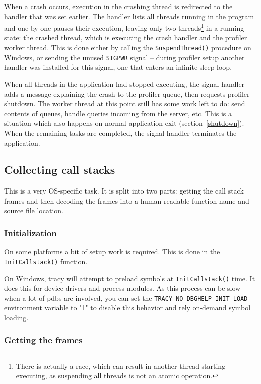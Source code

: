 \documentclass[hidelinks,titlepage,a4paper]{article}
\begin{document}
When a crash occurs, execution in the crashing thread is redirected to the handler that was set earlier. The handler lists all threads running in the program and one by one pauses their execution, leaving only two threads\footnote{There is actually a race, which can result in another thread starting executing, as suspending all threads is not an atomic operation.} in a running state: the crashed thread, which is executing the crash handler and the profiler worker thread. This is done either by calling the \texttt{SuspendThread()} procedure on Windows, or sending the unused \texttt{SIGPWR} signal -- during profiler setup another handler was installed for this signal, one that enters an infinite sleep loop.

When all threads in the application had stopped executing, the signal handler adds a message explaining the crash to the profiler queue, then requests profiler shutdown. The worker thread at this point still has some work left to do: send contents of queues, handle queries incoming from the server, etc. This is a situation which also happens on normal application exit (section~\ref{shutdown}). When the remaining tasks are completed, the signal handler terminates the application.

\subsection{Collecting call stacks}
\label{collectingcallstacks}

This is a very OS-specific task. It is split into two parts: getting the call stack frames and then decoding the frames into a human readable function name and source file location.

\subsubsection{Initialization}

On some platforms a bit of setup work is required. This is done in the \texttt{InitCallstack()} function.

On Windows, tracy will attempt to preload symbols at \texttt{InitCallstack()} time. It does this for device drivers and process modules. As this process can be slow when a lot of pdbs are involved, you can set the \texttt{TRACY\_NO\_DBGHELP\_INIT\_LOAD} environment variable to "1" to disable this behavior and rely on-demand symbol loading.

\subsubsection{Getting the frames}
\end{document}
